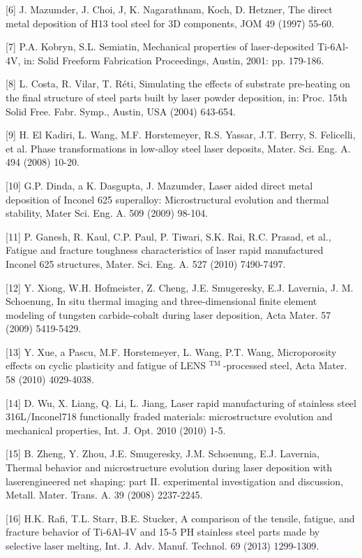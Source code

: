 \documentclass[10pt]{article}
\begin{document}
[6] J. Mazumder, J. Choi, J, K. Nagarathnam, Koch, D. Hetzner, The direct metal deposition of H13 tool steel for 3D components, JOM 49 (1997) 55-60.

[7] P.A. Kobryn, S.L. Semiatin, Mechanical properties of laser-deposited Ti-6Al-4V, in: Solid Freeform Fabrication Proceedings, Austin, 2001: pp. 179-186.

[8] L. Costa, R. Vilar, T. Réti, Simulating the effects of substrate pre-heating on the final structure of steel parts built by laser powder deposition, in: Proc. 15th Solid Free. Fabr. Symp., Austin, USA (2004) 643-654.

[9] H. El Kadiri, L. Wang, M.F. Horstemeyer, R.S. Yassar, J.T. Berry, S. Felicelli, et al. Phase transformations in low-alloy steel laser deposits, Mater. Sci. Eng. A. 494 (2008) 10-20.

[10] G.P. Dinda, a K. Dasgupta, J. Mazumder, Laser aided direct metal deposition of Inconel 625 superalloy: Microstructural evolution and thermal stability, Mater Sci. Eng. A. 509 (2009) 98-104.

[11] P. Ganesh, R. Kaul, C.P. Paul, P. Tiwari, S.K. Rai, R.C. Prasad, et al., Fatigue and fracture toughness characteristics of laser rapid manufactured Inconel 625 structures, Mater. Sci. Eng. A. 527 (2010) 7490-7497.

[12] Y. Xiong, W.H. Hofmeister, Z. Cheng, J.E. Smugeresky, E.J. Lavernia, J. M. Schoenung, In situ thermal imaging and three-dimensional finite element modeling of tungsten carbide-cobalt during laser deposition, Acta Mater. 57 (2009) 5419-5429.

[13] Y. Xue, a Pascu, M.F. Horstemeyer, L. Wang, P.T. Wang, Microporosity effects on cyclic plasticity and fatigue of LENS $^{\text {TM }}$-processed steel, Acta Mater. 58 (2010) 4029-4038.

[14] D. Wu, X. Liang, Q. Li, L. Jiang, Laser rapid manufacturing of stainless steel 316L/Inconel718 functionally fraded materials: microstructure evolution and mechanical properties, Int. J. Opt. 2010 (2010) 1-5.

[15] B. Zheng, Y. Zhou, J.E. Smugeresky, J.M. Schoenung, E.J. Lavernia, Thermal behavior and microstructure evolution during laser deposition with laserengineered net shaping: part II. experimental investigation and discussion, Metall. Mater. Trans. A. 39 (2008) 2237-2245.

[16] H.K. Rafi, T.L. Starr, B.E. Stucker, A comparison of the tensile, fatigue, and fracture behavior of Ti-6Al-4V and 15-5 PH stainless steel parts made by selective laser melting, Int. J. Adv. Manuf. Technol. 69 (2013) 1299-1309.
\end{document}
